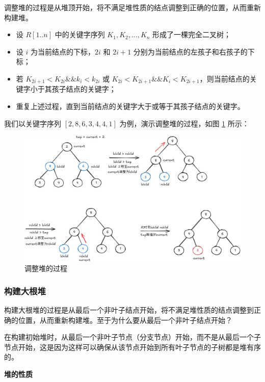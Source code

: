 \documentclass[lang=cn,newtx,10pt,scheme=chinese]{elegantbook}
\begin{document}
调整堆的过程是从堆顶开始，将不满足堆性质的结点调整到正确的位置，从而重新构建堆。
\begin{itemize}
  \item 设 $R[1..n]$ 中的关键字序列 $K_1, K_2, \dots, K_n$ 形成了一棵完全二叉树；
  \item 设 $i$ 为当前结点的下标，$2i$ 和 $2i+1$ 分别为当前结点的左孩子和右孩子的下标；
  \item 若 $K_{2i+1} < K_{2i} \&\& k_i < k_{2i}$ 或 $K_{2i} < K_{2i+1} \&\& K_i < K_{2i+1}$，则当前结点的关键字小于其孩子结点的关键字；
  \item 重复上述过程，直到当前结点的关键字大于或等于其孩子结点的关键字。
\end{itemize}

我们以关键字序列 $[2,8,6,3,4,4,1]$ 为例，演示调整堆的过程，如图 \ref{fig:adjustHeap} 所示：

\begin{figure}
[h!]
    \centering
    \includegraphics[width=1\textwidth]{./figure/pdf/cropped/heapAdjust.pdf}
    \caption{调整堆的过程}
    \label{fig:adjustHeap}
\end{figure}

\subsubsection{构建大根堆}

构建大根堆的过程是从最后一个非叶子结点开始，将不满足堆性质的结点调整到正确的位置，从而重新构建堆。至于为什么要从最后一个非叶子结点开始？

在构建初始堆时，从最后一个非叶子节点（分支节点）开始，而不是从最后一个子节点开始，这是因为这样可以确保从该节点开始到所有叶子节点的子树都是堆有序的。


\textbf{堆的性质}  
\end{document}
